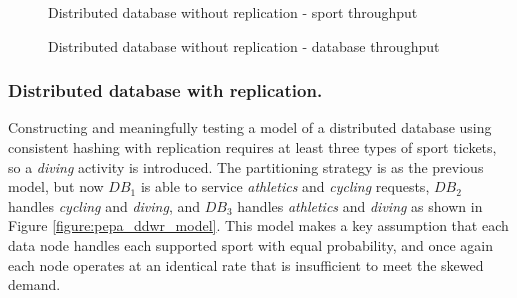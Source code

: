 \begin{figure}
	\centering
	\caption{Distributed database without replication - sport throughput}
	\label{figure:ddnr_sport}
\end{figure}

\begin{figure}
	\centering
	\caption{Distributed database without replication - database throughput}
	\label{figure:ddnr_database}
\end{figure}

%
%
\FloatBarrier
\subsubsection{Distributed database with replication.}  Constructing and meaningfully testing a model of a distributed database using consistent hashing with replication requires at least three types of sport tickets, so a {\itshape diving} activity is introduced.  The partitioning strategy is as the previous model, but now $\mathit{DB_1}$ is able to service {\itshape athletics} and {\itshape cycling} requests,  $\mathit{DB_2}$ handles {\itshape cycling} and {\itshape diving}, and $\mathit{DB_3}$ handles {\itshape athletics} and {\itshape diving} as shown in Figure \ref{figure:pepa_ddwr_model}.  This model makes a key assumption that each data node handles each supported sport with equal probability, and once again each node operates at an identical rate that is insufficient to meet the skewed demand.


